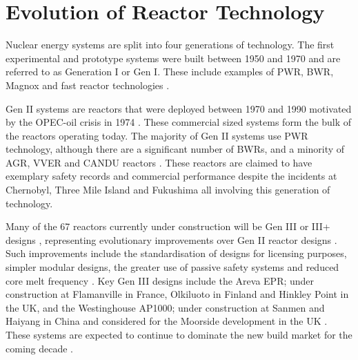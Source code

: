 \documentclass[journal]{IEEEtran}
\begin{document}
\section{Evolution of Reactor Technology}
Nuclear energy systems are split into four generations of technology. 
The first experimental and prototype systems were built between 1950 and 1970 \cite{GenIVRoadmap} and are referred to as Generation I or Gen I.
These include examples of PWR, BWR, Magnox and fast reactor technologies \cite{goldberg2011nuclear}\cite{Bhatnagar2011}. 

Gen II systems are reactors that were deployed between 1970 and 1990 motivated by the OPEC-oil crisis in 1974 \cite{Bhatnagar2011}.
These commercial sized systems form the bulk of the reactors operating today. The majority of Gen II systems use PWR technology, although there are a significant number of BWRs, and a minority of AGR, VVER and CANDU reactors \cite{IAEAReactors2013}. 
These reactors are claimed to have exemplary safety records and commercial performance \cite{Locatelli2013, goldberg2011nuclear, Bhatnagar2011, GenIVRoadmap} despite the incidents at Chernobyl, Three Mile Island and Fukushima all involving this generation of technology.

Many of the 67 reactors currently under construction will be Gen III or III+ designs \cite{IAEAReactors2013}, representing evolutionary improvements over Gen II reactor designs \cite{Marques2010a}. 
Such improvements include the standardisation of designs for licensing purposes, simpler modular designs, the greater use of passive safety systems and reduced core melt frequency \cite{schneider2012nuclear, Marques2010a}. 
Key Gen III designs include the Areva EPR; under construction at Flamanville in France, Olkiluoto in Finland and Hinkley Point in the UK, and the Westinghouse AP1000; under construction at Sanmen and Haiyang in China and considered for the Moorside development in the UK \cite{IAEAReactors2013}.
These systems are expected to continue to dominate the new build market for the coming decade \cite{Marques2010a}.
\end{document}
